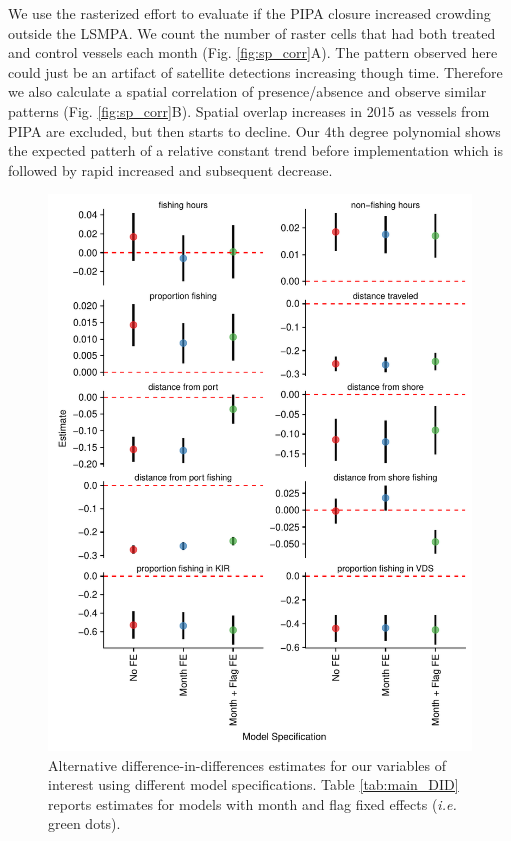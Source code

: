 \documentclass[9pt,twoside,lineno]{pnas-new}
\begin{document}
We use the rasterized effort to evaluate if the PIPA closure increased
crowding outside the LSMPA. We count the number of raster cells that
had both treated and control vessels each month (Fig.
\ref{fig:sp_corr}A). The pattern observed here could just be an artifact
of satellite detections increasing though time. Therefore we also
calculate a spatial correlation of presence/absence and observe similar
patterns (Fig. \ref{fig:sp_corr}B). Spatial overlap increases
in 2015 as vessels from PIPA are excluded, but then starts to decline.
Our 4th degree polynomial shows the expected patterh of a relative
constant trend before implementation which is followed by rapid increased
and subsequent decrease.

\clearpage



\clearpage

\begin{figure}
\centering
\includegraphics{img/other_specifications.pdf}
\caption{\label{fig:other_specifications}Alternative difference-in-differences estimates
for our variables of interest using different model specifications. Table \ref{tab:main_DID}
reports estimates for models with month and flag fixed effects (\emph{i.e.} green dots).}
\end{figure}
\end{document}
